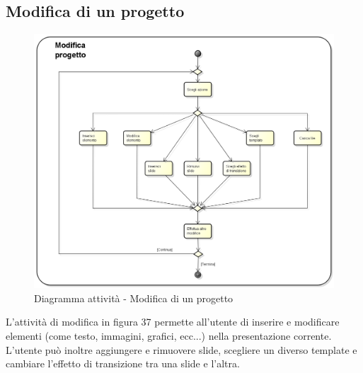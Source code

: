 \subsection{Modifica di un progetto}
\begin{figure}[h] 
	\centering 
	\includegraphics[scale=0.3] {img/activity_modifica.png}
	\caption{Diagramma attività - Modifica di un progetto} 
\end{figure}
L'attività di modifica in figura 37 permette all'utente di inserire e modificare elementi (come testo, immagini, grafici, ecc...) nella presentazione corrente. L'utente può inoltre aggiungere e rimuovere \gls{slide}, scegliere un diverso \gls{template} e cambiare l'effetto di transizione tra una \gls{slide} e l'altra.
\newpage

